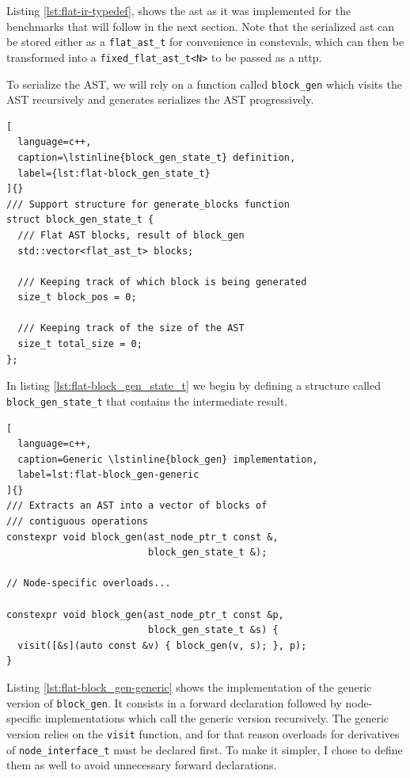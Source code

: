 \documentclass[../main]{subfiles}
\begin{document}
Listing \ref{lst:flat-ir-typedef}, shows the \gls{ast} as it was implemented
for the benchmarks that will follow in the next section.
Note that the serialized \gls{ast} can be stored either as a
\lstinline{flat_ast_t} for convenience in \glspl{consteval},
which can then be transformed into a \lstinline{fixed_flat_ast_t<N>}
to be passed as a \gls{nttp}.

To serialize the AST, we will rely on a function called \lstinline{block_gen}
which visits the AST recursively and generates serializes the AST progressively.

\begin{lstlisting}[
  language=c++,
  caption=\lstinline{block_gen_state_t} definition,
  label={lst:flat-block_gen_state_t}
]{}
/// Support structure for generate_blocks function
struct block_gen_state_t {
  /// Flat AST blocks, result of block_gen
  std::vector<flat_ast_t> blocks;

  /// Keeping track of which block is being generated
  size_t block_pos = 0;

  /// Keeping track of the size of the AST
  size_t total_size = 0;
};
\end{lstlisting}

In listing \ref{lst:flat-block_gen_state_t} we begin by defining a structure
called \lstinline{block_gen_state_t} that contains the intermediate result.

\begin{lstlisting}[
  language=c++,
  caption=Generic \lstinline{block_gen} implementation,
  label=lst:flat-block_gen-generic
]{}
/// Extracts an AST into a vector of blocks of
/// contiguous operations
constexpr void block_gen(ast_node_ptr_t const &,
                         block_gen_state_t &);

// Node-specific overloads...

constexpr void block_gen(ast_node_ptr_t const &p,
                         block_gen_state_t &s) {
  visit([&s](auto const &v) { block_gen(v, s); }, p);
}
\end{lstlisting}

Listing \ref{lst:flat-block_gen-generic} shows the implementation of the generic
version of \lstinline{block_gen}. It consists in a forward declaration
followed by node-specific implementations which call the generic version
recursively. The generic version relies on the \lstinline{visit} function,
and for that reason overloads for derivatives of \lstinline{node_interface_t}
must be declared first. To make it simpler, I chose to define them as well
to avoid unnecessary forward declarations.
\end{document}
